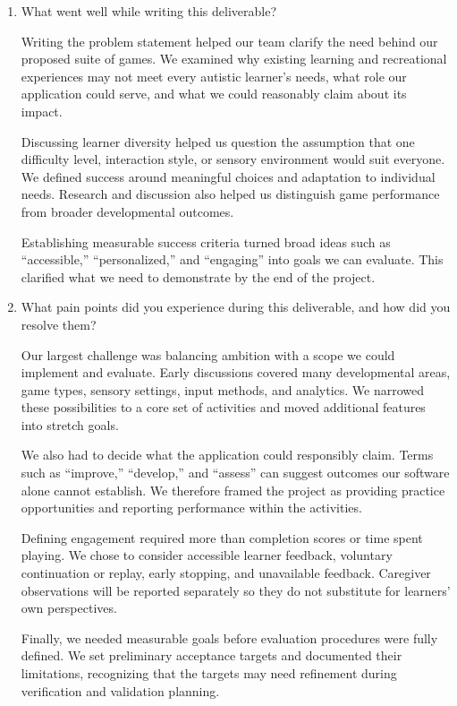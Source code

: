 \documentclass{article}
\begin{document}
\begin{enumerate}
    \item What went well while writing this deliverable?

    Writing the problem statement helped our team clarify the need behind
    our proposed suite of games. We examined why existing learning and
    recreational experiences may not meet every autistic learner's needs,
    what role our application could serve, and what we could reasonably
    claim about its impact.

    Discussing learner diversity helped us question the assumption that one
    difficulty level, interaction style, or sensory environment would suit
    everyone. We defined success around meaningful choices and adaptation
    to individual needs. Research and discussion also helped us distinguish
    game performance from broader developmental outcomes.

    Establishing measurable success criteria turned broad ideas such as
    ``accessible,'' ``personalized,'' and ``engaging'' into goals we can
    evaluate. This clarified what we need to demonstrate by the end of the
    project.

    \item What pain points did you experience during this deliverable, and how
    did you resolve them?

    Our largest challenge was balancing ambition with a scope we could
    implement and evaluate. Early discussions covered many developmental
    areas, game types, sensory settings, input methods, and analytics.
    We narrowed these possibilities to a core set of activities and moved
    additional features into stretch goals.

    We also had to decide what the application could responsibly claim.
    Terms such as ``improve,'' ``develop,'' and ``assess'' can suggest
    outcomes our software alone cannot establish. We therefore framed the
    project as providing practice opportunities and reporting performance
    within the activities.

    Defining engagement required more than completion scores or time spent
    playing. We chose to consider accessible learner feedback, voluntary
    continuation or replay, early stopping, and unavailable feedback.
    Caregiver observations will be reported separately so they do not
    substitute for learners' own perspectives.

    Finally, we needed measurable goals before evaluation procedures were
    fully defined. We set preliminary acceptance targets and documented
    their limitations, recognizing that the targets may need refinement
    during verification and validation planning.


\end{enumerate}
\end{document}
